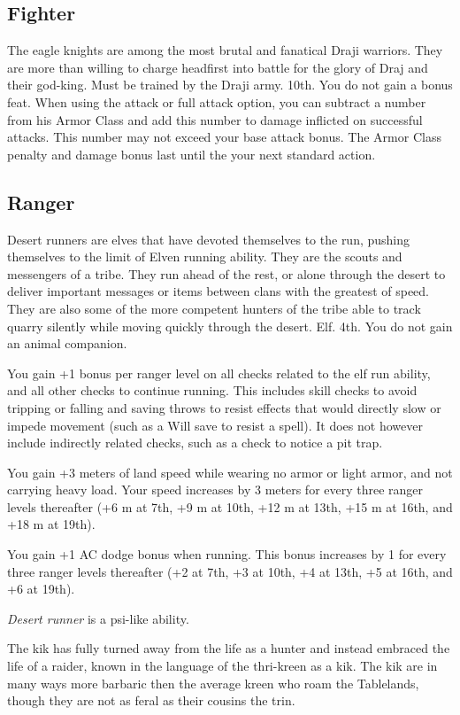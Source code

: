 \subsection{Fighter}
{The eagle knights are among the most brutal and fanatical Draji warriors. They are more than willing to charge headfirst into battle for the glory of Draj and their god-king.}
{Must be trained by the Draji army.}
{10th.}
{You do not gain a bonus feat.}
{
	When using the attack or full attack option, you can subtract a number from his Armor Class and add this number to damage inflicted on successful attacks. This number may not exceed your base attack bonus. The Armor Class penalty and damage bonus last until the your next standard action.
}

\subsection{Ranger}
{Desert runners are elves that have devoted themselves to the run, pushing themselves to the limit of Elven running ability. They are the scouts and messengers of a tribe. They run ahead of the rest, or alone through the desert to deliver important messages or items between clans with the greatest of speed. They are also some of the more competent hunters of the tribe able to track quarry silently while moving quickly through the desert.}
{Elf.}
{4th.}
{You do not gain an animal companion.}
{
	You gain +1 bonus per ranger level on all  checks related to the elf run ability, and all other checks to continue running. This includes skill checks to avoid tripping or falling and saving throws to resist effects that would directly slow or impede movement (such as a Will save to resist a  spell). It does not however include indirectly related checks, such as a  check to notice a pit trap.

	You gain +3 meters of land speed while wearing no armor or light armor, and not carrying heavy load. Your speed increases by 3 meters for every three ranger levels thereafter (+6 m at 7th, +9 m at 10th, +12 m at 13th, +15 m at 16th, and +18 m at 19th).

	You gain +1 AC dodge bonus when running. This bonus increases by 1 for every three ranger levels thereafter (+2 at 7th, +3 at 10th, +4 at 13th, +5 at 16th, and +6 at 19th).

	\emph{Desert runner} is a psi-like ability.
}
{The kik has fully turned away from the life as a hunter and instead embraced the life of a raider, known in the language of the thri-kreen as a kik. The kik
are in many ways more barbaric then the average kreen who roam the Tablelands, though they are not as feral as their cousins the trin.}
